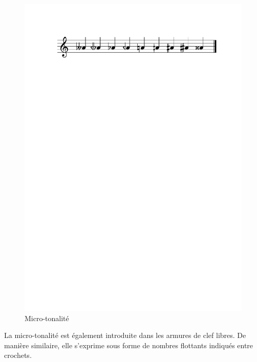 \documentclass{article}
\begin{document}
\begin{figure}[h]
\centering
\includegraphics[width=\columnwidth]{img/partitions/alter.pdf}
\caption{Micro-tonalité}
\label{fig:alter}
\end{figure}

La micro-tonalité est également introduite dans les armures de clef libres. De manière similaire, elle s'exprime sous forme de nombres flottants indiqués entre crochets.
\end{document}
